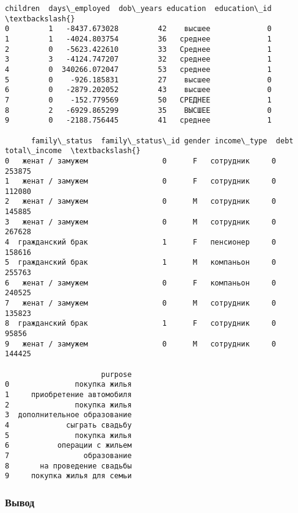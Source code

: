 \documentclass[11pt]{article}
\newcommand{\prompt}[4]{
        \llap{{\color{#2}[#3]: #4}}\vspace{-1.25em}
    }
\begin{document}
            \begin{tcolorbox}[breakable, boxrule=.5pt, size=fbox, pad at break*=1mm, opacityfill=0]
\prompt{Out}{outcolor}{25}{\hspace{3.5pt}}
\begin{Verbatim}[commandchars=\\\{\}]
   children  days\_employed  dob\_years education  education\_id  \textbackslash{}
0         1   -8437.673028         42    высшее             0
1         1   -4024.803754         36   среднее             1
2         0   -5623.422610         33   Среднее             1
3         3   -4124.747207         32   среднее             1
4         0  340266.072047         53   среднее             1
5         0    -926.185831         27    высшее             0
6         0   -2879.202052         43    высшее             0
7         0    -152.779569         50   СРЕДНЕЕ             1
8         2   -6929.865299         35    ВЫСШЕЕ             0
9         0   -2188.756445         41   среднее             1

      family\_status  family\_status\_id gender income\_type  debt  total\_income  \textbackslash{}
0   женат / замужем                 0      F   сотрудник     0        253875
1   женат / замужем                 0      F   сотрудник     0        112080
2   женат / замужем                 0      M   сотрудник     0        145885
3   женат / замужем                 0      M   сотрудник     0        267628
4  гражданский брак                 1      F   пенсионер     0        158616
5  гражданский брак                 1      M   компаньон     0        255763
6   женат / замужем                 0      F   компаньон     0        240525
7   женат / замужем                 0      M   сотрудник     0        135823
8  гражданский брак                 1      F   сотрудник     0         95856
9   женат / замужем                 0      M   сотрудник     0        144425

                      purpose
0               покупка жилья
1     приобретение автомобиля
2               покупка жилья
3  дополнительное образование
4             сыграть свадьбу
5               покупка жилья
6           операции с жильем
7                 образование
8       на проведение свадьбы
9     покупка жилья для семьи
\end{Verbatim}
\end{tcolorbox}
        
    \hypertarget{ux432ux44bux432ux43eux434}{%
\subsubsection{Вывод}\label{ux432ux44bux432ux43eux434}}
\end{document}

